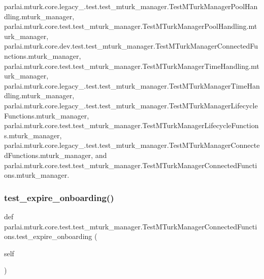 parlai.\+mturk.\+core.\+legacy\+\_.\+test.\+test\+\_\+mturk\+\_\+manager.\+Test\+M\+Turk\+Manager\+Pool\+Handling.\+mturk\+\_\+manager, parlai.\+mturk.\+core.\+test.\+test\+\_\+mturk\+\_\+manager.\+Test\+M\+Turk\+Manager\+Pool\+Handling.\+mturk\+\_\+manager, parlai.\+mturk.\+core.\+dev.\+test.\+test\+\_\+mturk\+\_\+manager.\+Test\+M\+Turk\+Manager\+Connected\+Functions.\+mturk\+\_\+manager, parlai.\+mturk.\+core.\+test.\+test\+\_\+mturk\+\_\+manager.\+Test\+M\+Turk\+Manager\+Time\+Handling.\+mturk\+\_\+manager, parlai.\+mturk.\+core.\+legacy\+\_.\+test.\+test\+\_\+mturk\+\_\+manager.\+Test\+M\+Turk\+Manager\+Time\+Handling.\+mturk\+\_\+manager, parlai.\+mturk.\+core.\+legacy\+\_.\+test.\+test\+\_\+mturk\+\_\+manager.\+Test\+M\+Turk\+Manager\+Lifecycle\+Functions.\+mturk\+\_\+manager, parlai.\+mturk.\+core.\+test.\+test\+\_\+mturk\+\_\+manager.\+Test\+M\+Turk\+Manager\+Lifecycle\+Functions.\+mturk\+\_\+manager, parlai.\+mturk.\+core.\+legacy\+\_.\+test.\+test\+\_\+mturk\+\_\+manager.\+Test\+M\+Turk\+Manager\+Connected\+Functions.\+mturk\+\_\+manager, and parlai.\+mturk.\+core.\+test.\+test\+\_\+mturk\+\_\+manager.\+Test\+M\+Turk\+Manager\+Connected\+Functions.\+mturk\+\_\+manager.

\mbox{\label{classparlai_1_1mturk_1_1core_1_1test_1_1test__mturk__manager_1_1TestMTurkManagerConnectedFunctions_a14648bdbd74b6ce0fdc3c7a06c1d2625}} 
\subsubsection{\texorpdfstring{test\+\_\+expire\+\_\+onboarding()}{test\_expire\_onboarding()}}
{\footnotesize\ttfamily def parlai.\+mturk.\+core.\+test.\+test\+\_\+mturk\+\_\+manager.\+Test\+M\+Turk\+Manager\+Connected\+Functions.\+test\+\_\+expire\+\_\+onboarding (\begin{DoxyParamCaption}\item[{}]{self }\end{DoxyParamCaption})}



